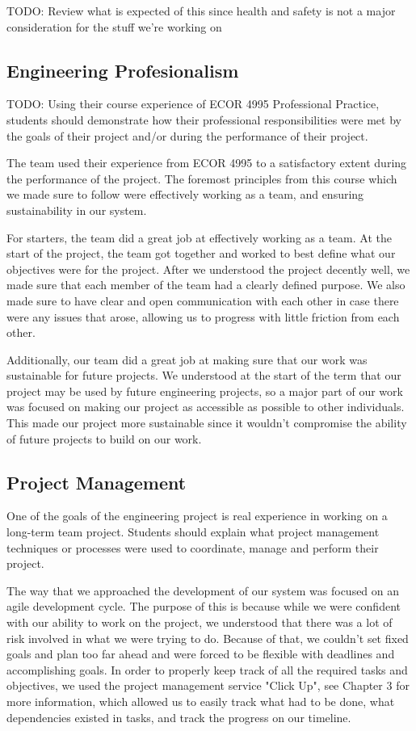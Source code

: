 \documentclass[titlepage,draft]{article}
\begin{document}
TODO: Review what is expected of this since health and safety is not a major consideration for the stuff we're working on

\subsection{Engineering Profesionalism}
TODO: Using their course experience of ECOR 4995 Professional Practice, students should demonstrate how their professional responsibilities were met by the goals of their project and/or during the performance of their project.

The team used their experience from ECOR 4995 to a satisfactory extent during the performance of the project. The foremost principles from this course which we made sure to follow were effectively working as a team, and ensuring sustainability in our system.

For starters, the team did a great job at effectively working as a team. At the start of the project, the team got together and worked to best define what our objectives were for the project. After we understood the project decently well, we made sure that each member of the team had a clearly defined purpose. We also made sure to have clear and open communication with each other in case there were any issues that arose, allowing us to progress with little friction from each other.

Additionally, our team did a great job at making sure that our work was sustainable for future projects. We understood at the start of the term that our project may be used by future engineering projects, so a major part of our work was focused on making our project as accessible as possible to other individuals. This made our project more sustainable since it wouldn't compromise the ability of future projects to build on our work.

\subsection{Project Management}
One of the goals of the engineering project is real experience in working on a long-term team project. Students should explain what project management techniques or processes were used to coordinate, manage and perform their project.

The way that we approached the development of our system was focused on an agile development cycle. The purpose of this is because while we were confident with our ability to work on the project, we understood that there was a lot of risk involved in what we were trying to do. Because of that, we couldn't set fixed goals and plan too far ahead and were forced to be flexible with deadlines and accomplishing goals. In order to properly keep track of all the required tasks and objectives, we used the project management service "Click Up", see Chapter 3 for more information, which allowed us to easily track what had to be done, what dependencies existed in tasks, and track the progress on our timeline.
\end{document}
